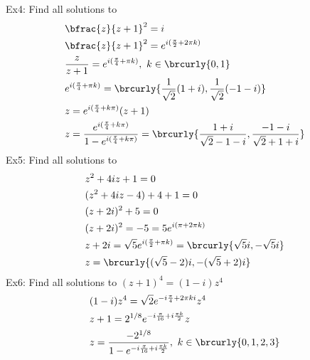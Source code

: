 Ex4: Find all solutions to
\begin{align*}
    &\bfrac{z}{z+1}^2=i\\
    &\bfrac{z}{z+1}^2=e^{i(\frac{\pi}{2}+2\pi k)}\\
    &\frac{z}{z+1}=e^{i(\frac{\pi}{4}+\pi k)},\ k\in\brcurly{0,1}\\
    &e^{i(\frac{\pi}{4}+\pi k)}=\brcurly{\frac{1}{\sqrt{2}}(1+i),\frac{1}{\sqrt{2}}(-1-i)}\\
    &z=e^{i(\frac{\pi}{4}+k\pi)}(z+1)\\
    &z=\frac{e^{i(\frac{\pi}{4}+k\pi)}}{1-e^{i(\frac{\pi}{4}+k\pi)}}=\brcurly{\frac{1+i}{\sqrt{2}-1-i},\frac{-1-i}{\sqrt{2}+1+i}}
\end{align*}
Ex5: Find all solutions to
\begin{align*}
    &z^2+4iz+1=0\\
    &(z^2+4iz-4)+4+1=0\\
    &(z+2i)^2+5=0\\
    &(z+2i)^2=-5=5e^{i(\pi+2\pi k)}\\
    &z+2i=\sqrt{5}e^{i(\frac{\pi}{2}+\pi k)}=\brcurly{\sqrt{5}i,-\sqrt{5}i}\\
    &z=\brcurly{(\sqrt{5}-2)i,-(\sqrt{5}+2)i}
\end{align*}
Ex6: Find all solutions to $(z+1)^4=(1-i)z^4$
\begin{align*}
    &(1-i)z^4=\sqrt{2}e^{-i\frac{\pi}{4}+2\pi ki}z^4\\
    &z+1=2^{1/8}e^{-i\frac{\pi}{16}+i\frac{\pi k}{2}}z\\
    &z=\frac{-2^{1/8}}{1-e^{-i\frac{\pi}{16}+i\frac{\pi k}{2}}},\ k\in\brcurly{0,1,2,3}
\end{align*}